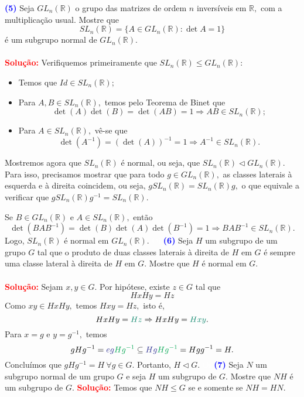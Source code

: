 \documentclass[12pt, a4paper]{article}
\newcommand{\sol}{\textbf{\textcolor{red}{Solução:}} }
\begin{document}
\textcolor{blue}{\bf(5)}\label{43} Seja $GL_n(\mathbb{R})$ o grupo das matrizes de ordem $n$ inversíveis em $\mathbb{R},$ com a multiplicação usual. Mostre que
\[
SL_n(\mathbb{R}) = \{ A \in GL_n(\mathbb{R}) : \det A = 1 \}
\]
é um subgrupo normal de $GL_n(\mathbb{R}).$\\ \\
\sol Verifiquemos primeiramente que $SL_n(\mathbb{R}) \le GL_n(\mathbb{R}):$
\begin{itemize}
    \item Temos que $Id \in SL_n(\mathbb{R});$
    \item Para $A, B \in SL_n(\mathbb{R}),$ temos pelo Teorema de Binet que
    \[
    \det(A)\det(B) = \det(AB) = 1 \Rightarrow AB \in SL_n(\mathbb{R});
    \]
    \item Para $A \in SL_n(\mathbb{R}),$ vê-se que
    \[
    \det(A^{-1})= (\det(A))^{-1} = 1 \Rightarrow A^{-1} \in SL_n(\mathbb{R}).\]
\end{itemize}

Mostremos agora que  $SL_n(\mathbb{R})$ é normal, ou seja, que  $SL_n(\mathbb{R}) \lhd GL_n(\mathbb{R}).$ Para isso, precisamos mostrar que para todo $g \in GL_n(\mathbb{R}),$ as classes laterais à esquerda e à direita coincidem, ou seja, $gSL_n(\mathbb{R}) = SL_n(\mathbb{R})g,$ o que equivale a verificar que $gSL_n(\mathbb{R})g^{-1} = SL_n(\mathbb{R}).$

Se $B \in GL_n(\mathbb{R})$ e $A \in SL_n(\mathbb{R}),$ então
\[
\det(BAB^{-1}) = \det(B) \det(A) \det(B^{-1}) = 1 \Rightarrow BAB^{-1} \in SL_n(\mathbb{R}).
\]
Logo, $SL_n(\mathbb{R})$ é normal em $GL_n(\mathbb{R}).$
\textcolor{white}{Oi}\newline\newline
\textcolor{blue}{\bf(6)}\label{44} Seja $H$ um subgrupo de um grupo $G$ tal que o produto de duas classes laterais à direita de $H$ em $G$ é sempre uma classe lateral à direita de $H$ em $G.$ Mostre que $H$ é normal em $G.$\\ \\ 
\sol Sejam $x,y \in G.$ Por hipótese, existe $z \in G$ tal que
\[
HxHy = Hz
\]
Como $xy \in HxHy,$ temos $Hxy = Hz,$ isto é, 
\[
HxHy = \textcolor{PineGreen}{Hz} \Rightarrow HxHy = \textcolor{PineGreen}{Hxy}.
\]
Para $x = g$ e $y = g^{-1},$ temos
\[
gHg^{-1} = \textcolor{Blue}{eg}\textcolor{Green}{Hg^{-1}} \subseteq \textcolor{Blue}{Hg}\textcolor{Green}{Hg^{-1}} = Hgg^{-1} = H.
\]
Concluímos que $gHg^{-1} = H \ \forall g \in G.$ Portanto, $H \lhd G.$
\textcolor{white}{Oi}\newline\newline
\textcolor{blue}{\bf(7)}\label{45} Seja $N$ um subgrupo normal de um grupo $G$ e seja $H$ um subgrupo de $G.$ Mostre que $NH$ é um subgrupo de $G.$
\sol Temos que $NH \le G$ se e somente se $NH = HN.$
\end{document}
